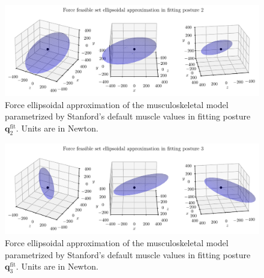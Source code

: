 \begin{figure}[!htb]
    \centering
    \captionsetup{justification=centering}
    \begin{minipage}{\linewidth}
        \centering
        \includegraphics[trim={0 0 0 0}, clip, width=1\linewidth]{img/chapter_4/reconstruction_stanford_imgs/STANFORD_ELLIPSOID_POSTURE_FITTING_02.pdf}
    \end{minipage}
    \caption{Force ellipsoidal approximation of the musculoskeletal model parametrized by Stanford's default muscle values in fitting posture $\mathbf{q}_2^{\text{fit}}$. Units are in Newton.}
    \label{fig:ellipsoid_pose_2}
\end{figure}

\begin{figure}[!htb]
    \centering
    \captionsetup{justification=centering}
    \begin{minipage}{\linewidth}
        \centering
        \includegraphics[trim={0 0 0 0}, clip, width=1\linewidth]{img/chapter_4/reconstruction_stanford_imgs/STANFORD_ELLIPSOID_POSTURE_FITTING_03.pdf}
    \end{minipage}
    \caption{Force ellipsoidal approximation of the musculoskeletal model parametrized by Stanford's default muscle values in fitting posture $\mathbf{q}_3^{\text{fit}}$. Units are in Newton.}
    \label{fig:ellipsoid_pose_3}
\end{figure}

